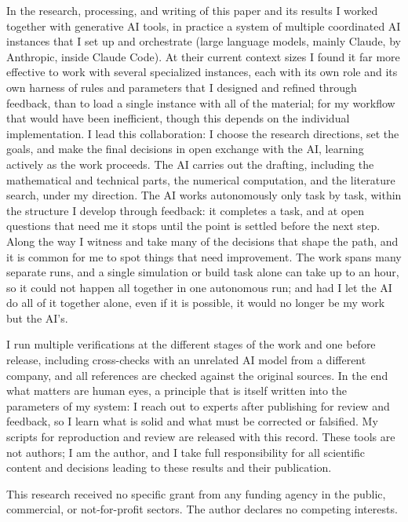 \documentclass[aps,pra,twocolumn,superscriptaddress,longbibliography,floatfix,nofootinbib]{revtex4-2}
\begin{document}
In the research, processing, and writing of this paper and its results I worked together with generative AI tools, in practice a system of multiple coordinated AI instances that I set up and orchestrate (large language models, mainly Claude, by Anthropic, inside Claude Code). At their current context sizes I found it far more effective to work with several specialized instances, each with its own role and its own harness of rules and parameters that I designed and refined through feedback, than to load a single instance with all of the material; for my workflow that would have been inefficient, though this depends on the individual implementation. I lead this collaboration: I choose the research directions, set the goals, and make the final decisions in open exchange with the AI, learning actively as the work proceeds. The AI carries out the drafting, including the mathematical and technical parts, the numerical computation, and the literature search, under my direction. The AI works autonomously only task by task, within the structure I develop through feedback: it completes a task, and at open questions that need me it stops until the point is settled before the next step. Along the way I witness and take many of the decisions that shape the path, and it is common for me to spot things that need improvement. The work spans many separate runs, and a single simulation or build task alone can take up to an hour, so it could not happen all together in one autonomous run; and had I let the AI do all of it together alone, even if it is possible, it would no longer be my work but the AI's.

I run multiple verifications at the different stages of the work and one before release, including cross-checks with an unrelated AI model from a different company, and all references are checked against the original sources. In the end what matters are human eyes, a principle that is itself written into the parameters of my system: I reach out to experts after publishing for review and feedback, so I learn what is solid and what must be corrected or falsified. My scripts for reproduction and review are released with this record. These tools are not authors; I am the author, and I take full responsibility for all scientific content and decisions leading to these results and their publication.

\begin{acknowledgments}
This research received no specific grant from any funding agency in the
public, commercial, or not-for-profit sectors. The author declares no
competing interests.
\end{acknowledgments}
\end{document}
